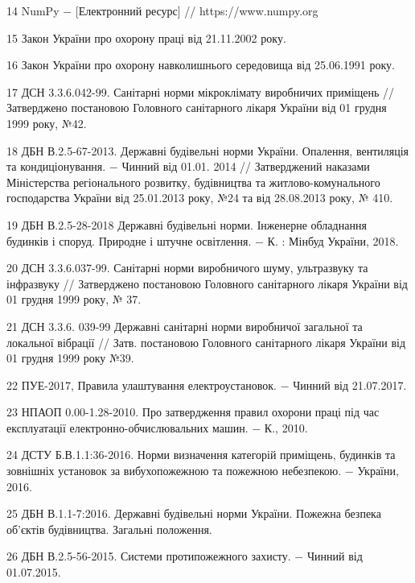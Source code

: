 14 NumPy $-$ [Електронний ресурс] // https://www.numpy.org

15 Закон України про охорону праці від 21.11.2002 року.

16 Закон України про охорону навколишнього середовища від 25.06.1991 року.

17 ДСН 3.3.6.042-99. Санітарні норми мікроклімату виробничих приміщень // Затверджено постановою Головного санітарного лікаря України від 01 грудня 1999 року, №42.

18 ДБН В.2.5-67-2013. Державні будівельні норми України. Опалення, вентиляція та кондиціонування. $-$ Чинний від 01.01. 2014 // Затверджений наказами Міністерства регіонального розвитку, будівництва та житлово-комунального господарства України від 25.01.2013 року, №24 та від 28.08.2013 року, № 410.

19 ДБН В.2.5-28-2018 Державні будівельні норми. Інженерне обладнання будинків і споруд. Природне і штучне освітлення. $-$ К. : Мінбуд України, 2018. 

20 ДСН 3.3.6.037-99. Санітарні норми виробничого шуму, ультразвуку та інфразвуку // Затверджено постановою Головного санітарного лікаря України від 01 грудня 1999 року, № 37.

21 ДСН 3.3.6. 039-99 Державні санітарні норми виробничої загальної та локальної вібрації // Затв. постановою Головного санітарного лікаря України від 01 грудня 1999 року №39.

22 ПУЕ-2017, Правила улаштування електроустановок. $-$ Чинний від 21.07.2017.

23 НПАОП 0.00-1.28-2010. Про затвердження правил охорони праці під час експлуатації електронно-обчислювальних машин. $-$ К., 2010.

24 ДСТУ Б.В.1.1:36-2016. Норми визначення категорій приміщень, будинків та зовнішніх установок за вибухопожежною та пожежною небезпекою. $-$ України, 2016. 

25 ДБН В.1.1-7:2016. Державні будівельні норми України. Пожежна безпека об’єктів будівництва. Загальні положення.

26 ДБН В.2.5-56-2015. Системи протипожежного захисту. $-$ Чинний від 01.07.2015.
